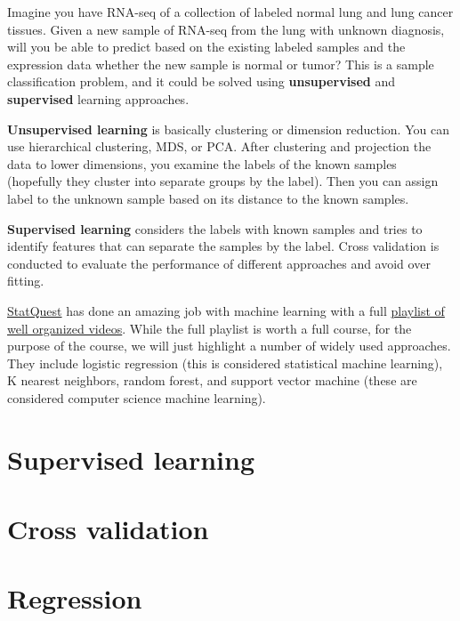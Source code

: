 \documentclass[
]{book}
\begin{document}
Imagine you have RNA-seq of a collection of labeled normal lung and lung cancer tissues. Given a new sample of RNA-seq from the lung with unknown diagnosis, will you be able to predict based on the existing labeled samples and the expression data whether the new sample is normal or tumor? This is a sample classification problem, and it could be solved using \textbf{unsupervised} and \textbf{supervised} learning approaches.

\textbf{Unsupervised learning} is basically clustering or dimension reduction. You can use hierarchical clustering, MDS, or PCA. After clustering and projection the data to lower dimensions, you examine the labels of the known samples (hopefully they cluster into separate groups by the label). Then you can assign label to the unknown sample based on its distance to the known samples.

\textbf{Supervised learning} considers the labels with known samples and tries to identify features that can separate the samples by the label. Cross validation is conducted to evaluate the performance of different approaches and avoid over fitting.

\href{https://statquest.org/video-index/}{StatQuest} has done an amazing job with machine learning with a full \href{https://youtube.com/playlist?list=PLblh5JKOoLUICTaGLRoHQDuF_7q2GfuJF}{playlist of well organized videos}. While the full playlist is worth a full course, for the purpose of the course, we will just highlight a number of widely used approaches. They include logistic regression (this is considered statistical machine learning), K nearest neighbors, random forest, and support vector machine (these are considered computer science machine learning).

\hypertarget{supervised-learning}{%
\section{Supervised learning}\label{supervised-learning}}

\hypertarget{cross-validation}{%
\section{Cross validation}\label{cross-validation}}

\hypertarget{regression}{%
\section{Regression}\label{regression}}
\end{document}
